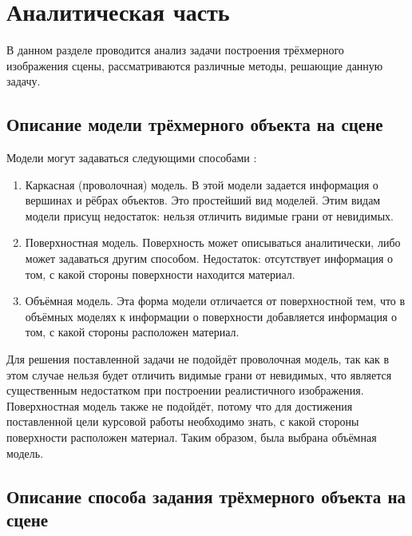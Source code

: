 \chapter{Аналитическая часть}

В данном разделе проводится анализ задачи построения трёхмерного изображения сцены, рассматриваются различные методы, решающие данную задачу.

\section{Описание модели трёхмерного объекта на сцене}

Модели могут задаваться следующими способами \cite{rodgers}:
\begin{enumerate}[label=\arabic*)]
	\item Каркасная (проволочная) модель. В этой модели задается информация о вершинах и рёбрах объектов. Это простейший вид моделей. Этим видам модели присущ недостаток:  нельзя отличить видимые грани от невидимых.
	\item Поверхностная модель. Поверхность может описываться аналитически, либо может задаваться другим способом. Недостаток: отсутствует информация о том, с какой стороны поверхности находится материал.
	\item Объёмная модель. Эта форма модели отличается от поверхностной тем, что в объёмных моделях к информации
	о поверхности добавляется информация о том, с какой стороны расположен материал.
\end{enumerate}

Для решения поставленной задачи не подойдёт проволочная модель, так как в этом случае нельзя будет отличить видимые грани от невидимых, что является существенным недостатком при построении реалистичного изображения. Поверхностная модель также не подойдёт, потому что для достижения поставленной цели курсовой работы необходимо знать, с какой стороны поверхности расположен материал. Таким образом, была выбрана объёмная модель.

\section{Описание способа задания трёхмерного объекта на сцене}

